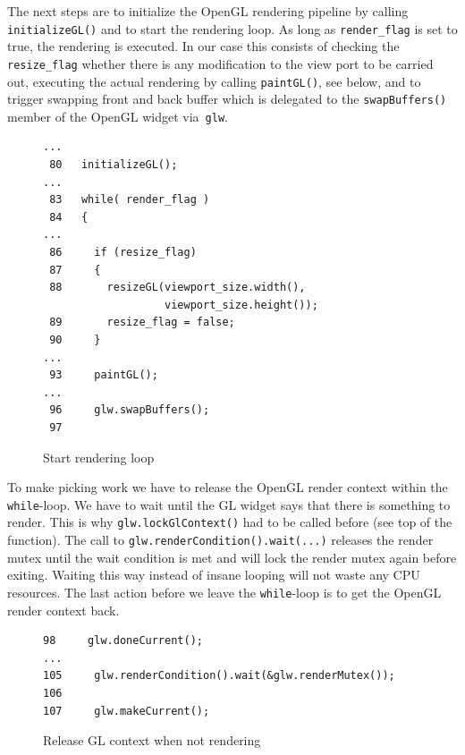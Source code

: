 \documentclass[jou,noapacite]{apa}
\begin{document}
The next steps are to initialize the OpenGL rendering pipeline by
calling \lstinline|initializeGL()| and to start the rendering loop.
%
As long as \lstinline|render_flag| is set to true, the rendering is executed.
%
In our case this consists of checking the \lstinline|resize_flag| whether there
is any modification to the view port to be carried out, executing the actual
rendering by calling \lstinline|paintGL()|, see below, and to trigger swapping
front and back buffer which is delegated to the \lstinline|swapBuffers()| member
of the OpenGL widget via~\lstinline|glw|.
%
\begin{figure}[h]
\begin{lstlisting}[basicstyle=\scriptsize]
...
 80   initializeGL();
...
 83   while( render_flag )
 84   {
...
 86     if (resize_flag)
 87     {
 88       resizeGL(viewport_size.width(),
                   viewport_size.height());
 89       resize_flag = false;
 90     }
...
 93     paintGL();
...
 96     glw.swapBuffers();
 97
\end{lstlisting}
\caption{Start rendering loop}
\end{figure}

To make picking work we have to release the OpenGL render context within
the \lstinline[keywordstyle=\color{black}]|while|-loop.
%
We have to wait until the GL widget says that there is something to render.
%
This is why \lstinline|glw.lockGlContext()| had to be called before (see top of
the function).
%
The call to \lstinline|glw.renderCondition().wait(...)| releases the render
mutex until the wait condition is met and will lock the render mutex again
before exiting.
%
Waiting this way instead of insane looping will not waste any CPU resources.
%
The last action before we leave the \lstinline[keywordstyle=\color{black}]|while|-loop is to get the OpenGL
render context back.
%
\begin{figure}[h]
\begin{lstlisting}[basicstyle=\scriptsize]
 98     glw.doneCurrent();
...
105     glw.renderCondition().wait(&glw.renderMutex());
106
107     glw.makeCurrent();
\end{lstlisting}
\caption{Release GL context when not rendering}
\end{figure}
\end{document}
